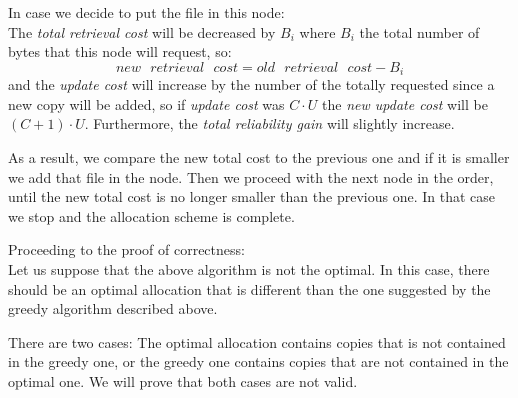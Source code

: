 In case we decide to put the file in this node: \\
The \textit{total retrieval cost} will be decreased by $B_i$ where $B_i$ the total number of bytes that this node will request, so: $$new\text{ }retrieval\text{ }cost = old\text{ }retrieval\text{ }cost - B_i$$ and the \textit{update cost} will increase by the number of the totally requested since a new copy will be added, so if \textit{update cost} was $C \cdot U$ the \textit{new update cost} will be $(C+1) \cdot U$. Furthermore, the \textit{total reliability gain} will slightly increase.

As a result, we compare the new total cost to the previous one and if it is smaller we add that file in the node. Then we proceed with the next node in the order, until the new total cost is no longer smaller than the previous one. In that case we stop and the allocation scheme is complete.

Proceeding to the proof of correctness: \\
Let us suppose that the above algorithm is not the optimal. In this case, there should be an optimal allocation that is different than the one suggested by the greedy algorithm described above. 

There are two cases: The optimal allocation contains copies that is not contained in the greedy one, or the greedy one contains copies that are not contained in the optimal one. We will prove that both cases are not valid. 

